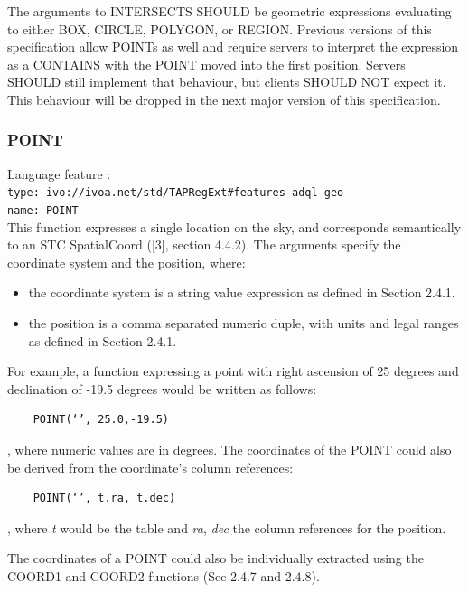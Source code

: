 \documentclass[11pt,a4paper]{ivoa}
\begin{document}
The arguments to INTERSECTS SHOULD be geometric expressions evaluating to
either BOX, CIRCLE, POLYGON, or REGION. Previous versions of this
specification allow POINTs as well and require servers to interpret the
expression as a CONTAINS with the POINT moved into the first position. Servers
SHOULD still implement that behaviour, but clients SHOULD NOT expect it. This
behaviour will be dropped in the next major version of this specification.

\subsubsection{POINT}
\label{sec:geom.functions.point}
{\footnotesize Language feature :}\\
{\footnotesize \verb|type: ivo://ivoa.net/std/TAPRegExt#features-adql-geo|}\\
{\footnotesize \verb|name: POINT|}\\

This function expresses a single location on the sky, and corresponds
semantically to an STC SpatialCoord ([3], section 4.4.2). The arguments
specify the coordinate system and the position, where:

\begin{itemize}
    \item the coordinate system is a string value expression as defined in Section 2.4.1.
    \item the position is a comma separated numeric duple, with units and legal ranges as defined in Section 2.4.1.
\end{itemize}

For example, a function expressing a point with right ascension of 25 degrees
and declination of -19.5 degrees would be written as follows:

\begin{verbatim}
    POINT(‘’, 25.0,-19.5)
\end{verbatim}

, where numeric values are in degrees. The coordinates of the POINT could
also be derived from the coordinate’s column references:

\begin{verbatim}
    POINT(‘’, t.ra, t.dec)
\end{verbatim}
    
, where \textit{t} would be the table and \textit{ra}, \textit{dec} the
column references for the position.

The coordinates of a POINT could also be individually extracted using the
COORD1 and COORD2 functions (See 2.4.7 and 2.4.8).
\end{document}
